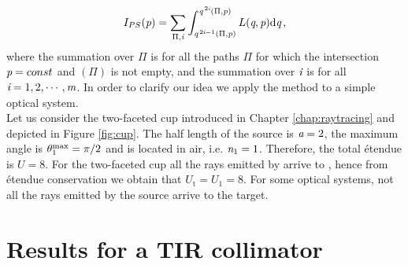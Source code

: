 \begin{equation}
I_{PS}(\textit{p}) = \sum_{\Pi, \textit{i} }\int_{\textit{q}^{\,2\textit{i}-1}(\Pi, \textit{p})}^{\textit{q}^{\,2\textit{i}}( \Pi, \textit{p})}L(\textit{q}, \textit{p})\textrm{d}\textit{q}\,,
\label{eq:Ips}
\end{equation}
where the summation over $\Pi$ is for all the paths $\Pi$ for which the intersection $\textit{p} = const$ and $(\Pi)$ is not empty, and the summation over $\textit{i}$ is for all $\textit{i} = 1,2, \cdots, \textit{m}$.
In order to clarify our idea we apply the method to a simple optical system.
\\ \indent Let us consider the two-faceted cup introduced in Chapter \ref{chap:raytracing} and depicted in Figure \ref{fig:cup}. The half length of the source is $\textit{a}=2$, the maximum angle is $\theta_1^{\textrm{max}} = \pi/2$ and  is located in air, i.e. $\textit{n}_1=1$. Therefore, the total \'{e}tendue is $U=8$. For the two-faceted cup all the rays emitted by  arrive to , hence from \'{e}tendue conservation we obtain that $U_{\textrm{t}} =U_1 = 8$.
For some optical systems, not all the rays emitted by the source arrive to the target.  



\section{Results for a TIR collimator}

